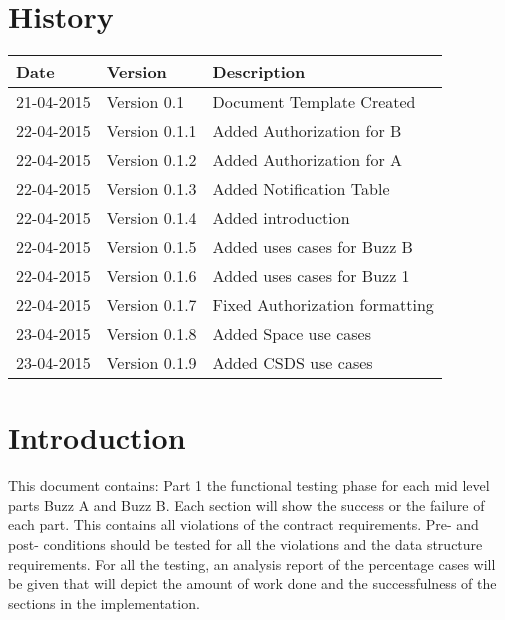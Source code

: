 \documentclass[12pt]{article}
\begin{document}


\section{History}
\begin{tabular}{|p{3cm}|p{5cm}|p{6cm}|}

\hline
Date & Version & Description\\ %
\hline
21-04-2015 & Version 0.1 & Document Template Created\\ %
\hline
22-04-2015 & Version 0.1.1 & Added Authorization for B\\ %
\hline
22-04-2015 & Version 0.1.2 & Added Authorization for A\\ %
\hline
22-04-2015 & Version 0.1.3 & Added Notification Table\\ %
\hline
22-04-2015 & Version 0.1.4 & Added introduction\\ %
\hline
22-04-2015 & Version 0.1.5 & Added uses cases for Buzz B\\ %
\hline
22-04-2015 & Version 0.1.6 & Added uses cases for Buzz 1\\ %
\hline
22-04-2015 & Version 0.1.7 & Fixed Authorization formatting\\ %
\hline
23-04-2015 & Version 0.1.8 & Added Space use cases\\ %
\hline
23-04-2015 & Version 0.1.9 & Added CSDS use cases\\ %
\hline
\end{tabular}

\newpage
\tableofcontents
\newpage

\section{Introduction} %
This document contains:
Part 1 the functional testing phase for each mid level parts Buzz A and Buzz B.
Each section will show the success or the failure of each part. This contains all violations of the contract requirements.
Pre- and post- conditions should be tested for all the violations and the data structure requirements.
For all the testing, an analysis report of the percentage cases will be given that will depict the amount of work done and the successfulness of the sections in the implementation.
\end{document}
